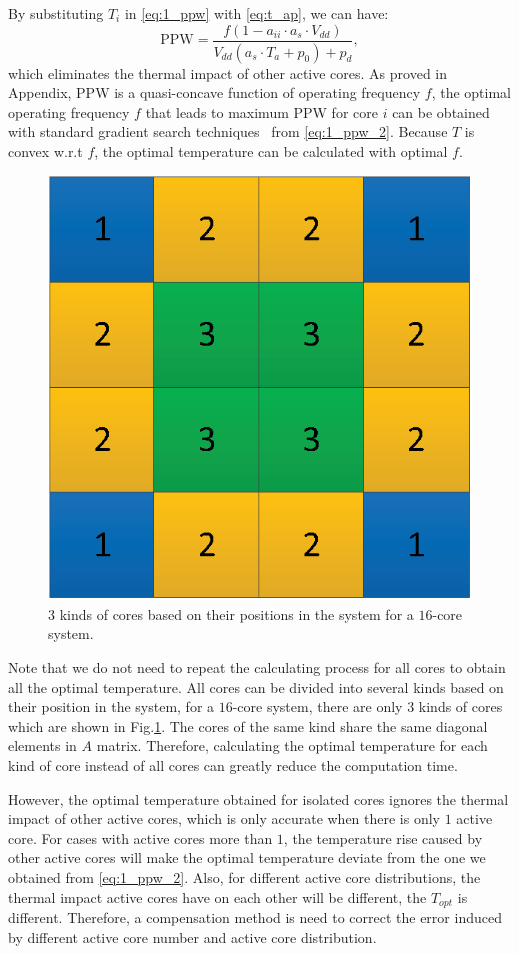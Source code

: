 By substituting $T_{i}$ in \eqref{eq:1_ppw} with \eqref{eq:t_ap}, we can have:
\begin{equation}\label{eq:1_ppw_2}
\text{PPW} = \frac{f(1-a_{ii} \cdot a_{s} \cdot V_{dd})}{V_{dd}(a_{s}\cdot T_{a}+p_{0})+p_{d}},
\end{equation}
which eliminates the thermal impact of other active cores. As proved in Appendix, PPW is a quasi-concave function of operating frequency $f$, the optimal operating frequency $f$ that leads to maximum PPW for core $i$ can be obtained with standard gradient search techniques~\cite{Boyd:Convex_BOOK'06} from \eqref{eq:1_ppw_2}. Because $T$ is convex w.r.t $f$, the optimal temperature can be calculated with optimal $f$.

\begin{figure}
\centering
\includegraphics[width=0.46\linewidth]{fig/unique_position.eps}
\caption{$3$ kinds of cores based on their positions in the system for a $16$-core system.}
\label{fig:unique_position}
\end{figure}

Note that we do not need to repeat the calculating process for all cores to obtain all the optimal temperature. All cores can be divided into several kinds based on their position in the system, for a $16$-core system, there are only $3$ kinds of cores which are shown in Fig.\ref{fig:unique_position}. The cores of the same kind share the same diagonal elements in $A$ matrix. Therefore, calculating the optimal temperature for each kind of core instead of all cores can greatly reduce the computation time.

However, the optimal temperature obtained for isolated cores ignores the thermal impact of other active cores, which is only accurate when there is only $1$ active core. For cases with active cores more than $1$, the temperature rise caused by other active cores will make the optimal temperature deviate from the one we obtained from \eqref{eq:1_ppw_2}. Also, for different active core distributions, the thermal impact active cores have on each other will be different, the $T_{opt}$ is different. Therefore, a compensation method is need to correct the error induced by different active core number and active core distribution.


